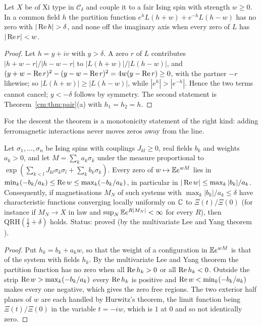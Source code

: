 \begin{proposition}\label{cm:prop:strippair}
Let $X$ be of Xi type in $\mathcal C_\delta$ and couple it to a fair Ising spin with strength $w\ge0$. In a common field $h$ the partition function $e^{h}L(h+w)+e^{-h}L(h-w)$ has no zero with $|\re h|>\delta$, and none off the imaginary axis when every zero of $L$ has $|\operatorname{Re} r|<w$.
\end{proposition}

\begin{proof}
Let $h=y+iv$ with $y>\delta$. A zero $r$ of $L$ contributes $|h+w-r|/|h-w-r|$ to $|L(h+w)|/|L(h-w)|$, and $(y+w-\operatorname{Re} r)^2-(y-w-\operatorname{Re} r)^2=4w(y-\operatorname{Re} r)\ge0$, with the partner $-r$ likewise; so $|L(h+w)|\ge|L(h-w)|$, while $|e^{h}|>|e^{-h}|$. Hence the two terms cannot cancel; $y<-\delta$ follows by symmetry. The second statement is Theorem~\ref{cm:thm:pair}(a) with $h_1=h_2=h$.
\end{proof}

For the descent the theorem is a monotonicity statement of the right kind: adding ferromagnetic interactions never moves zeros away from the line.

\begin{proposition}\label{cm:prop:fieldstrip}
Let $\sigma_1,\dots,\sigma_n$ be Ising spins with couplings $J_{kl}\ge0$, real fields $b_k$ and weights $a_k>0$, and let $M=\sum_ka_k\sigma_k$ under the measure proportional to $\exp(\sum_{k<l}J_{kl}\sigma_k\sigma_l+\sum_kb_k\sigma_k)$. Every zero of $w\mapsto\mathbb{E} e^{wM}$ lies in $\min_k(-b_k/a_k)\le\operatorname{Re} w\le\max_k(-b_k/a_k)$, in particular in $|\operatorname{Re} w|\le\max_k|b_k|/a_k$. Consequently, if magnetisations $M_N$ of such systems with $\max_k|b_k|/a_k\le\delta$ have characteristic functions converging locally uniformly on $\mathbb{C}$ to $\Xi(t)/\Xi(0)$ (for instance if $M_N\to X$ in law and $\sup_N\mathbb{E} e^{R|M_N|}<\infty$ for every $R$), then $\mathrm{QRH}(\frac12+\delta)$ holds. Status: proved (by the multivariate Lee and Yang theorem \cite{LeeYang}).
\end{proposition}

\begin{proof}
Put $h_k=b_k+a_kw$, so that the weight of a configuration in $\mathbb{E} e^{wM}$ is that of the system with fields $h_k$. By the multivariate Lee and Yang theorem the partition function has no zero when all $\operatorname{Re} h_k>0$ or all $\operatorname{Re} h_k<0$. Outside the strip $\operatorname{Re} w>\max_k(-b_k/a_k)$ every $\operatorname{Re} h_k$ is positive and $\operatorname{Re} w<\min_k(-b_k/a_k)$ makes every one negative, which gives the zero free regions. The two exterior half planes of $w$ are each handled by Hurwitz's theorem, the limit function being $\Xi(t)/\Xi(0)$ in the variable $t=-iw$, which is $1$ at $0$ and so not identically zero.
\end{proof}

